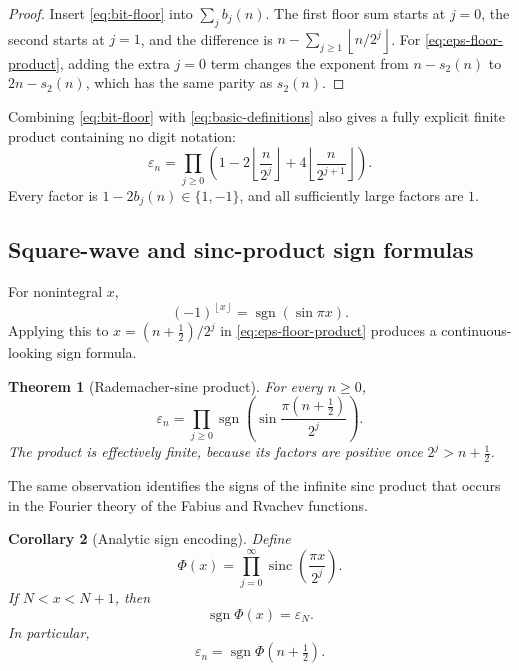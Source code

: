 \documentclass[11pt,oneside]{article}
\newtheorem{theorem}{Theorem}[section]
\newtheorem{corollary}[theorem]{Corollary}
\theoremstyle{definition}
\theoremstyle{remark}
\newcommand{\sgn}{\operatorname{sgn}}
\newcommand{\sinc}{\operatorname{sinc}}
\newcommand{\bitsum}{s_2}
\newcommand{\eps}{\varepsilon}
\newcommand{\floor}[1]{\left\lfloor #1\right\rfloor}
\begin{document}
\begin{proof}
Insert \eqref{eq:bit-floor} into \(\sum_jb_j(n)\).  The first floor sum starts
at \(j=0\), the second starts at \(j=1\), and the difference is
\(n-\sum_{j\ge1}\floor{n/2^j}\).  For \eqref{eq:eps-floor-product}, adding the
extra \(j=0\) term changes the exponent from \(n-\bitsum(n)\) to
\(2n-\bitsum(n)\), which has the same parity as \(\bitsum(n)\).
\end{proof}

Combining \eqref{eq:bit-floor} with \eqref{eq:basic-definitions} also gives a
fully explicit finite product containing no digit notation:
\begin{equation}
  \eps_n=
  \prod_{j\ge0}
  \left(
    1-2\floor{\frac{n}{2^j}}+4\floor{\frac{n}{2^{j+1}}}
  \right).
  \label{eq:pure-floor-product}
\end{equation}
Every factor is \(1-2b_j(n)\in\{1,-1\}\), and all sufficiently large factors
are \(1\).

\subsection{Square-wave and sinc-product sign formulas}
\label{sec:sinc-sign}

For nonintegral \(x\),
\begin{equation}
  (-1)^{\floor{x}}=\sgn(\sin \pi x).
  \label{eq:square-wave}
\end{equation}
Applying this to \(x=(n+\tfrac12)/2^j\) in
\eqref{eq:eps-floor-product} produces a continuous-looking sign formula.

\begin{theorem}[Rademacher-sine product]
For every \(n\ge0\),
\begin{equation}
  \eps_n=
  \prod_{j\ge0}
  \sgn\!\left(
    \sin\frac{\pi(n+\tfrac12)}{2^j}
  \right).
  \label{eq:sine-sign-product}
\end{equation}
The product is effectively finite, because its factors are positive once
\(2^j>n+\tfrac12\).
\end{theorem}

The same observation identifies the signs of the infinite sinc product that
occurs in the Fourier theory of the Fabius and Rvachev functions.

\begin{corollary}[Analytic sign encoding]
Define
\begin{equation}
  \Phi(x)=\prod_{j=0}^{\infty}
    \sinc\!\left(\frac{\pi x}{2^j}\right).
  \label{eq:Phi-sinc-product}
\end{equation}
If \(N<x<N+1\), then
\begin{equation}
  \sgn \Phi(x)=\eps_N.
  \label{eq:sinc-interval-sign}
\end{equation}
In particular,
\begin{equation}
  \eps_n=\sgn\Phi\!\left(n+\tfrac12\right).
  \label{eq:sinc-half-sample}
\end{equation}
\end{corollary}
\end{document}
